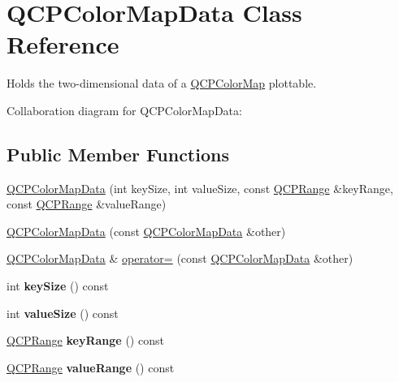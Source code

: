 \hypertarget{classQCPColorMapData}{}\section{Q\+C\+P\+Color\+Map\+Data Class Reference}
\label{classQCPColorMapData}


Holds the two-\/dimensional data of a \hyperlink{classQCPColorMap}{Q\+C\+P\+Color\+Map} plottable.  




Collaboration diagram for Q\+C\+P\+Color\+Map\+Data\+:
\subsection*{Public Member Functions}
\begin{DoxyCompactItemize}
\item 
\hyperlink{classQCPColorMapData_aac9d8eb81e18e240d89d56c01933fd23}{Q\+C\+P\+Color\+Map\+Data} (int key\+Size, int value\+Size, const \hyperlink{classQCPRange}{Q\+C\+P\+Range} \&key\+Range, const \hyperlink{classQCPRange}{Q\+C\+P\+Range} \&value\+Range)
\item 
\hyperlink{classQCPColorMapData_a7f2145d86473263494abb9bf1de20436}{Q\+C\+P\+Color\+Map\+Data} (const \hyperlink{classQCPColorMapData}{Q\+C\+P\+Color\+Map\+Data} \&other)
\item 
\hyperlink{classQCPColorMapData}{Q\+C\+P\+Color\+Map\+Data} \& \hyperlink{classQCPColorMapData_afdf4dd1b2f5714234fe84709b85c2a8d}{operator=} (const \hyperlink{classQCPColorMapData}{Q\+C\+P\+Color\+Map\+Data} \&other)
\item 
\mbox{\label{classQCPColorMapData_abbda4d28de97aedce1e6e6f008a0a1f7}} 
int {\bfseries key\+Size} () const
\item 
\mbox{\label{classQCPColorMapData_a8510cafea24645bbb62b5e0bfc43209f}} 
int {\bfseries value\+Size} () const
\item 
\mbox{\label{classQCPColorMapData_a1e43abd20a77b922b7cecfc69bf4dad7}} 
\hyperlink{classQCPRange}{Q\+C\+P\+Range} {\bfseries key\+Range} () const
\item 
\mbox{\label{classQCPColorMapData_a818e4e384aa4e5fad69ac603924394d3}} 
\hyperlink{classQCPRange}{Q\+C\+P\+Range} {\bfseries value\+Range} () const

\end{DoxyCompactItemize}
